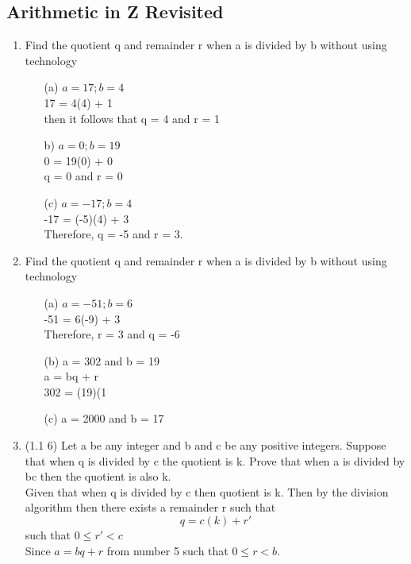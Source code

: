 \documentclass[12pt]{article}
\begin{document}
\subsection*{Arithmetic in Z Revisited}
\begin{enumerate}
    \item Find the quotient q and remainder r when a is divided by b without using technology 
    \begin{itemize}
        \item[(a)] $ a = 17; b = 4$ \\
        17 = 4(4) + 1 \\
        then it follows that q = 4 and r = 1
        \item[b)] $a = 0 ; b = 19 $ \\
        0 = 19(0) + 0 \\
        q = 0 and r = 0 
        \item[(c)] $a = -17; b = 4$ \\
        -17 = (-5)(4) + 3 \\
        Therefore, q = -5 and r = 3. 
    \end{itemize}
    \item Find the quotient q and remainder r when a is divided by b without using technology 
    \begin{itemize}
        \item[(a)] $a = -51 ; b = 6$ \\
        -51 = 6(-9) + 3 \\
        Therefore, r = 3 and q = -6
        \item[(b)] a = 302 and b = 19 \\
        a = bq + r \\
        302 = (19)(1
        \item[(c)] a = 2000 and b = 17 
    \end{itemize}
    \item (1.1 6) Let a be any integer and b and c be any positive integers. Suppose that when q is divided by c the quotient is k. Prove that when a is divided by bc then the quotient is also k. \\
    Given that when q is divided by c then quotient is k. Then by the division algorithm then there exists a remainder r such that 
    \begin{equation*}
        q = c(k) + r'
    \end{equation*}
    such that $0 \leq r' < c$ \\
    Since $a = b q + r$ from number 5 such that $0 \leq r < b$. 

\end{enumerate}
\end{document}
